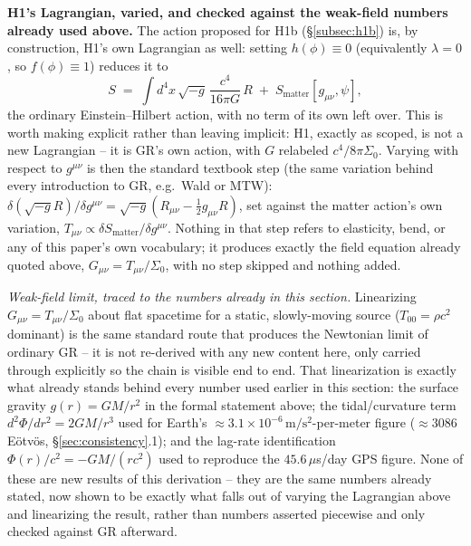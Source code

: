 \documentclass[12pt, a4paper]{article}
\begin{document}
\textbf{H1's Lagrangian, varied, and checked against the weak-field
numbers already used above.} The action proposed for H1b
(\S\ref{subsec:h1b}) is, by construction, H1's own Lagrangian as well:
setting $h(\phi)\equiv0$ (equivalently $\lambda=0$, so $f(\phi)\equiv1$)
reduces it to
\begin{equation}
S \;=\; \int d^4x\,\sqrt{-g}\,\frac{c^4}{16\pi G}\,R \;+\; S_{\text{matter}}[g_{\mu\nu},\psi],
\end{equation}
the ordinary Einstein--Hilbert action, with no term of its own left
over. This is worth making explicit rather than leaving implicit: H1,
exactly as scoped, is not a new Lagrangian -- it is GR's own action,
with $G$ relabeled $c^4/8\pi\Sigma_0$. Varying with respect to
$g^{\mu\nu}$ is then the standard textbook step (the same variation
behind every introduction to GR, e.g.\ Wald or MTW): $\delta(\sqrt{-g}R)
/\delta g^{\mu\nu} = \sqrt{-g}(R_{\mu\nu}-\tfrac12 g_{\mu\nu}R)$, set
against the matter action's own variation, $T_{\mu\nu} \propto
\delta S_{\text{matter}}/\delta g^{\mu\nu}$. Nothing in that step refers
to elasticity, bend, or any of this paper's own vocabulary; it
produces exactly the field equation already quoted above,
$G_{\mu\nu}=T_{\mu\nu}/\Sigma_0$, with no step skipped and nothing
added.

\emph{Weak-field limit, traced to the numbers already in this
section.} Linearizing $G_{\mu\nu}=T_{\mu\nu}/\Sigma_0$ about flat
spacetime for a static, slowly-moving source ($T_{00}=\rho c^2$
dominant) is the same standard route that produces the Newtonian limit
of ordinary GR -- it is not re-derived with any new content here,
only carried through explicitly so the chain is visible end to end.
That linearization is exactly what already stands behind every number
used earlier in this section: the surface gravity $g(r)=GM/r^2$ in
the formal statement above; the tidal/curvature term
$d^2\Phi/dr^2=2GM/r^3$ used for Earth's $\approx3.1\times10^{-6}
\,\mathrm{m/s^2}$-per-meter figure ($\approx3086$ Eötvös,
\S\ref{sec:consistency}.1); and the lag-rate identification
$\Phi(r)/c^2=-GM/(rc^2)$ used to reproduce the $45.6\,\mu$s/day GPS
figure. None of these are new results of this derivation -- they are
the same numbers already stated, now shown to be exactly what falls
out of varying the Lagrangian above and linearizing the result, rather
than numbers asserted piecewise and only checked against GR
afterward.
\end{document}
